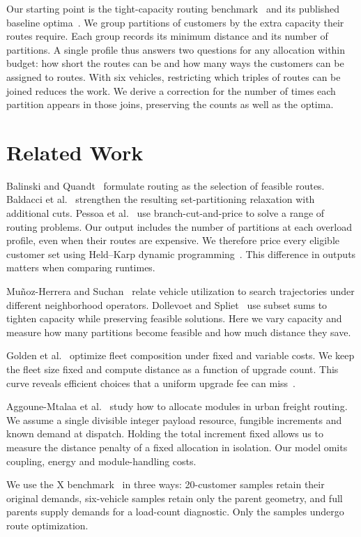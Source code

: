 \documentclass[runningheads]{llncs}
\begin{document}
Our starting point is the tight-capacity routing benchmark~\cite{qob} and its published baseline optima~\cite{tc}. We group partitions of customers by the extra capacity their routes require. Each group records its minimum distance and its number of partitions. A single profile thus answers two questions for any allocation within budget: how short the routes can be and how many ways the customers can be assigned to routes. With six vehicles, restricting which triples of routes can be joined reduces the work. We derive a correction for the number of times each partition appears in those joins, preserving the counts as well as the optima.

\section{Related Work}
Balinski and Quandt~\cite{bq} formulate routing as the selection of feasible routes. Baldacci et al.~\cite{master} strengthen the resulting set-partitioning relaxation with additional cuts. Pessoa et al.~\cite{generic} use branch-cut-and-price to solve a range of routing problems. Our output includes the number of partitions at each overload profile, even when their routes are expensive. We therefore price every eligible customer set using Held--Karp dynamic programming~\cite{hk}. This difference in outputs matters when comparing runtimes.

Muñoz-Herrera and Suchan~\cite{landscape} relate vehicle utilization to search trajectories under different neighborhood operators. Dollevoet and Spliet~\cite{pre} use subset sums to tighten capacity while preserving feasible solutions. Here we vary capacity and measure how many partitions become feasible and how much distance they save.

Golden et al.~\cite{fleet} optimize fleet composition under fixed and variable costs. We keep the fleet size fixed and compute distance as a function of upgrade count. This curve reveals efficient choices that a uniform upgrade fee can miss~\cite{pareto}.

Aggoune-Mtalaa et al.~\cite{modules} study how to allocate modules in urban freight routing. We assume a single divisible integer payload resource, fungible increments and known demand at dispatch. Holding the total increment fixed allows us to measure the distance penalty of a fixed allocation in isolation. Our model omits coupling, energy and module-handling costs.

We use the X benchmark~\cite{x} in three ways: 20-customer samples retain their original demands, six-vehicle samples retain only the parent geometry, and full parents supply demands for a load-count diagnostic. Only the samples undergo route optimization.
\end{document}

